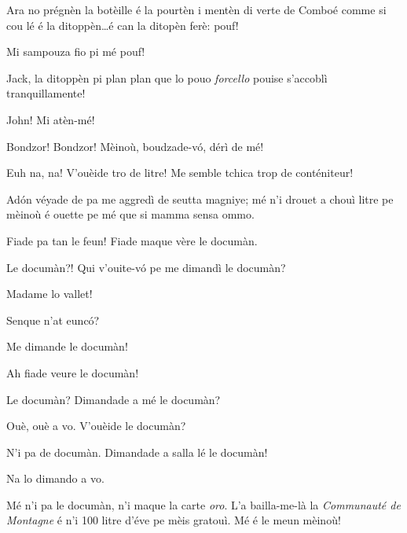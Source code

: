 \begin{drama}
\Jackspeaks Ara no prégnèn la botèille é la pourtèn i mentèn di verte de Comboé comme si cou lé é la ditoppèn\ldots é can la ditopèn ferè: pouf!

\Prosperospeaks Mi sampouza fio pi mé pouf!

\Johnspeaks Jack, la ditoppèn pi plan plan que lo pouo \textit{forcello} pouise s'accoblì tranquillamente! 


\Jackspeaks John! Mi atèn-mé!


\scene[-- 1000 litre!]


\Naimaspeaks{} Bondzor!  Bondzor! Mèinoù, boudzade-v\'o, dérì de mé!

\Prosperospeaks Euh na, na! V'ouèide tro de litre! Me semble tchica trop de conténiteur!

\Naimaspeaks Ad\'on véyade de pa me aggredì de seutta magniye; mé n'i drouet a chouì litre pe mèinoù é ouette pe mé que si mamma sensa ommo.

\Prosperospeaks Fiade pa tan le feun! Fiade maque vère le documàn.

\Naimaspeaks Le documàn?! Qui v'ouite-v\'o pe me dimandì le documàn? 

\Prosperospeaks Madame lo vallet!


\Valletspeaks Senque n'at eunc\'o?

\Naimaspeaks Me dimande le documàn!

\Valletspeaks Ah fiade veure le documàn!

\Naimaspeaks Le documàn? Dimandade a mé le documàn?

\Valletspeaks Ouè, ouè a vo. V'ouèide le documàn?

\Naimaspeaks N'i pa de documàn. Dimandade a salla lé  le documàn!

\Valletspeaks Na lo dimando a vo.

\Naimaspeaks Mé n'i pa le documàn, n'i maque la carte \textit{oro}.  L'a bailla-me-là la \textit{Communauté de Montagne} é n'i 100 litre d'éve pe mèis gratouì. Mé é le meun mèinoù!


\end{drama}
